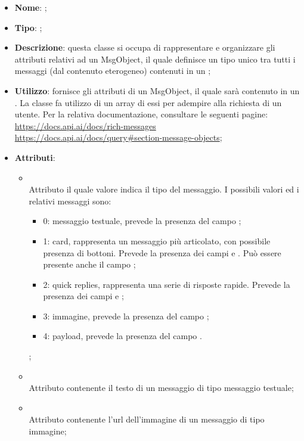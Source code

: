 \begin{itemize}
	\item \textbf{Nome}: ;
	\item \textbf{Tipo}: ;
	\item \textbf{Descrizione}: questa classe si occupa di rappresentare e organizzare gli attributi relativi ad un MsgObject, il quale definisce un tipo unico tra tutti i messaggi (dal contenuto eterogeneo) contenuti in un ;
	\item \textbf{Utilizzo}: fornisce gli attributi di un MsgObject, il quale sarà contenuto in un .
La classe  fa utilizzo di un array di essi per adempire alla richiesta di un utente.
Per la relativa documentazione, consultare le seguenti pagine: \\
\url{https://docs.api.ai/docs/rich-messages} \\
\url{https://docs.api.ai/docs/query#section-message-objects};
	\item \textbf{Attributi}:
	\begin{itemize}
		\item[]  \\
		Attributo il quale valore indica il tipo del messaggio. I possibili valori ed i relativi messaggi sono:
\begin{itemize}
  \item 0: messaggio testuale, prevede la presenza del campo ;
  \item 1: card, rappresenta un messaggio più articolato, con possibile presenza di bottoni. Prevede la presenza dei campi  e . Può essere presente anche il campo ;
  \item 2: quick replies, rappresenta una serie di risposte rapide. Prevede la presenza dei campi  e ;
  \item 3: immagine, prevede la presenza del campo ;
  \item 4: payload, prevede la presenza del campo .
\end{itemize};
		\item[]  \\
		Attributo contenente il testo di un messaggio di tipo messaggio testuale;
		\item[]  \\
		Attributo contenente l'url dell'immagine di un messaggio di tipo immagine;

\end{itemize}
\end{itemize}
